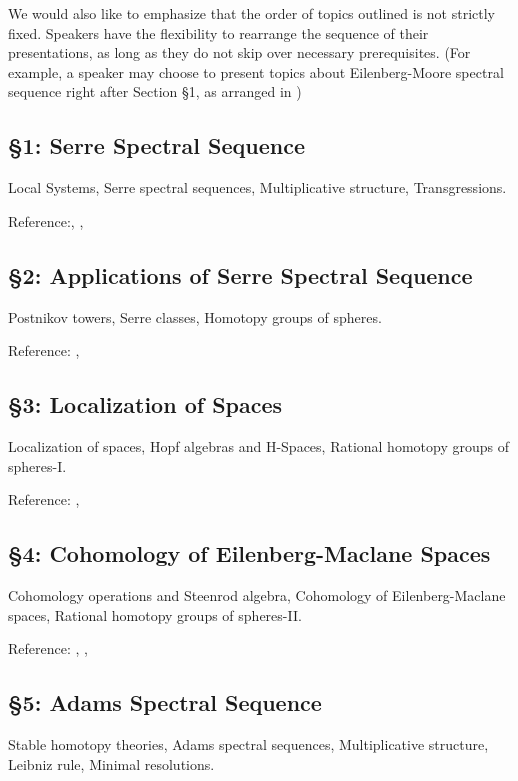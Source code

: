 \documentclass[12pt, reqno]{amsart}
\theoremstyle{definition}
\theoremstyle{remark}
\numberwithin{equation}{section}
\begin{document}
{We would also like to emphasize that the order of topics outlined is not strictly fixed. Speakers have the flexibility to rearrange the sequence of their presentations, as long as they do not skip over necessary prerequisites. (For example, a speaker may choose to present topics about Eilenberg-Moore spectral sequence right after Section §1, as arranged in \cite{McC01})
\subsection*{\textbf{§1: Serre Spectral Sequence}}


Local Systems, Serre spectral sequences, Multiplicative structure, Transgressions.

Reference:\cite{McC01}, \cite{HatSS}, \cite{Hat02}

\subsection*{\textbf{§2: Applications of Serre Spectral Sequence}}

Postnikov towers, Serre classes, Homotopy groups of spheres.

Reference: \cite{Hat02}, \cite{HatSS}

\subsection*{\textbf{§3: Localization of Spaces}}

Localization of spaces, Hopf algebras and H-Spaces, Rational homotopy groups of spheres-I.

Reference: \cite{HatSS}, \cite{Hat02}

\subsection*{\textbf{§4: Cohomology of Eilenberg-Maclane Spaces}}

Cohomology operations and Steenrod algebra, Cohomology of Eilenberg-Maclane spaces, Rational homotopy groups of spheres-II.

Reference: \cite{MT08}, \cite{Hat02}, \cite{HatSS}

\subsection*{\textbf{§5: Adams Spectral Sequence}}

Stable homotopy theories, Adams spectral sequences, Multiplicative structure, Leibniz rule, Minimal resolutions.

}
\end{document}
